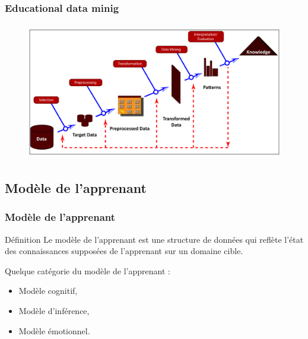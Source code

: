 \documentclass[aspectratio=169,professionalfonts, 12pt]{beamer}
\begin{document}
\begin{frame}
  \frametitle{Educational data minig}
  \justifying 
  \begin{minipage}{\textwidth}
  \begin{figure}[H]
      \includegraphics[height=6cm]{images/etat_art/extract_data_steps.png}
  \end{figure}
  \end{minipage}
\end{frame}


\subsection{Modèle de l’apprenant}

\begin{frame}
  \frametitle{Modèle de l’apprenant}
  \justifying 
  \begin{minipage}{\textwidth}
  \begin{block}{Définition}
    Le modèle de l’apprenant est une structure de données qui reflète l’état des connaissances supposées de l’apprenant sur un domaine cible.
  \end{block}
  \end{minipage} 
  \begin{minipage}{\textwidth}
  \begin{block}{}
    Quelque catégorie du modèle de l’apprenant :
    \begin{itemize}
      \item Modèle cognitif,
      \item Modèle d’inférence,
      \item Modèle émotionnel.
    \end{itemize}
  \end{block}
  \end{minipage}
\end{frame}
\end{document}

